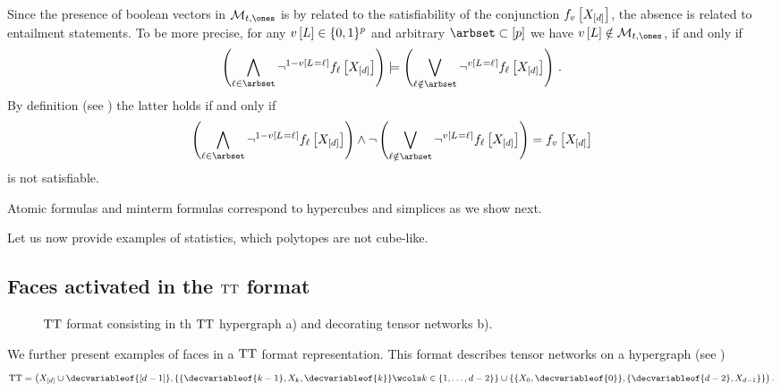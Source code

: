 Since the presence of boolean vectors in $\hlnmeanset$ is by  related to the satisfiability of the conjunction $ f_{v}\left[X_{[d]}\right]$, the absence is related to entailment statements.
To be more precise, for any $v\left[L\right]\in\{0,1\}^{p}$ and arbitrary $\arbset\subset[\seldim]$ we have $\imelementwith\notin\hlnmeanset$, if and only if
\begin{align*}
    \left(\bigwedge_{\selindex\in\arbset} \lnot^{1-\imelementat{\indexedselvariable}} \formulaofat{\selindex}{\shortcatvariables} \right)
    \models \left(\bigvee_{\selindex\notin\arbset}\lnot^{\imelementat{\indexedselvariable}} \formulaofat{\selindex}{\shortcatvariables} \right) \, .
\end{align*}
By definition (see \cite{russell_artificial_2021}) the latter holds if and only if
\begin{align*}
    \left(\bigwedge_{\selindex\in\arbset} \lnot^{1-\imelementat{\indexedselvariable}} \formulaofat{\selindex}{\shortcatvariables} \right)
    \land \lnot \left(\bigvee_{\selindex\notin\arbset}\lnot^{\imelementat{\indexedselvariable}} \formulaofat{\selindex}{\shortcatvariables} \right)
    = \formulaofat{\imelement}{\shortcatvariables}
\end{align*}
is not satisfiable.

Atomic formulas and minterm formulas correspond to hypercubes and simplices as we show next.





Let us now provide examples of statistics, which polytopes are not cube-like.



\subsection{Faces activated in the $\mathrm{TT}$ format}

\begin{figure}
    
    \caption{$\mathrm{TT}$ format consisting in th $\mathrm{TT}$ hypergraph a) and decorating tensor networks b).}\label{fig:ttFormat}
\end{figure}


We further present examples of faces in a $\mathrm{TT}$ format representation.
This format describes tensor networks on a hypergraph (see )
\begin{align*}
    \ttformat
    = \big(
    \shortcatvariables\cup\decvariableof{[\catorder-1]},
    \{\{\decvariableof{\catenumerator-1},\catvariableof{\catenumerator},\decvariableof{\catenumerator}\}\wcols\catenumerator\in\{1,\ldots,\catorder-2\}\}
    \cup\{\{\catvariableof{0},\decvariableof{0}\},\{\decvariableof{\catorder-2},\catvariableof{\catorder-1}\}\}
    \big) \, .
\end{align*}

